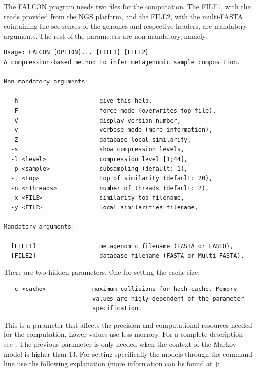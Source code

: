 \documentclass[11pt,journal,compsoc]{report}[1]
\begin{document}
The FALCON program needs two files for the computation. The FILE1,
with the reads provided from the NGS platform, and the FILE2,
with the multi-FASTA cointaining the sequences of the genomes and
respective headers, are mandatory arguments. The rest of the parameters
are non mandatory, namely:
\begin{lstlisting}
Usage: FALCON [OPTION]... [FILE1] [FILE2]                                
A compression-based method to infer metagenomic sample composition.      
                                                                         
Non-mandatory arguments:                                                 
                                                                         
  -h                       give this help,                               
  -F                       force mode (overwrites top file),             
  -V                       display version number,                       
  -v                       verbose mode (more information),              
  -Z                       database local similarity,                    
  -s                       show compression levels,                      
  -l <level>               compression level [1;44],                    
  -p <sample>              subsampling (default: 1),                    
  -t <top>                 top of similarity (default: 20),              
  -n <nThreads>            number of threads (default: 2),              
  -x <FILE>                similarity top filename,                      
  -y <FILE>                local similarities filename,                  
                                                                         
Mandatory arguments:                                                     
                                                                         
  [FILE1]                  metagenomic filename (FASTA or FASTQ),        
  [FILE2]                  database filename (FASTA or Multi-FASTA).
\end{lstlisting}
There are two hidden parameters. One for setting the cache size:
\begin{lstlisting}
  -c <cache>             maximum collisions for hash cache. Memory     
                         values are higly dependent of the parameter   
                         specification.                                
\end{lstlisting}
This is a parameter that affects the precision and computational resources
needed for the computation. Lower values use less memory. For a complete
description see \cite{Pratas-2016a,Pratas-2016b}.
The previous parameter is only needed when the context of the Markov model
is higher than 13. For setting specifically the models through the command
line use the following explanation (more information can be found at 
\cite{Pratas-2016a,Pratas-2016b}):
\end{document}
